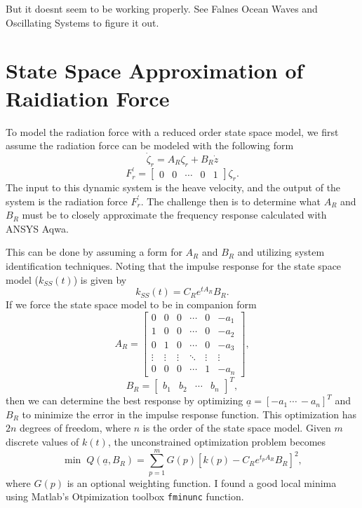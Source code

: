 \documentclass[12pt]{article}
\begin{document}
But it doesnt seem to be working properly. See Falnes Ocean Waves and Oscillating Systems to figure it out.


\section*{State Space Approximation of Raidiation Force}

To model the radiation force with a reduced order state space model, we first assume the radiation force can be modeled with the following form
\[
	\dot{\zeta}_r = A_R \zeta_r + B_R \dot{z}
\]
\[
	F_r^\prime = 
	\begin{bmatrix}
		0 & 0 & \cdots & 0 & 1
	\end{bmatrix} 
	\zeta_r.
\]
The input to this dynamic system is the heave velocity, and the output of the system is the radiation force $F_r^\prime$. The challenge then is to determine what $A_R$ and $B_R$ must be to closely approximate the frequency response calculated with ANSYS Aqwa.

This can be done by assuming a form for $A_R$ and $B_R$ and utilizing system identification techniques. Noting that the impulse response for the state space model ($k_{SS}(t)$) is given by
\[
	k_{SS}(t) = C_R e^{t A_R} B_R.
\]
If we force the state space model to be in companion form
\[
	A_R = 
	\begin{bmatrix}
		0 & 0 & 0 & \cdots & 0 & -a_1 \\
		1 & 0 & 0 & \cdots & 0 & -a_2 \\
		0 & 1 & 0 & \cdots & 0 & -a_3 \\
		\vdots & \vdots & \vdots & \ddots & \vdots & \vdots \\
		0 & 0 & 0 & \cdots & 1 & -a_n
	\end{bmatrix},
\]
\[
	B_R = 
	\begin{bmatrix}
		b_1 & b_2 & \cdots & b_n
	\end{bmatrix}^T,
\]
then we can determine the best response by optimizing $\underline{a} = [-a_1 \, \cdots  \, -a_n]^T$ and $B_R$ to minimize the error in the impulse response function. This optimization has $2n$ degrees of freedom, where $n$ is the order of the state space model. Given $m$ discrete values of $k(t)$, the unconstrained optimization problem becomes
\[
	\min \; Q(\underline{a}, B_R) = \sum_{p = 1}^{m} G(p) [k(p) - C_R e^{t_p A_R} B_R ]^2,
\]
where $G(p)$ is an optional weighting function. I found a good local minima using Matlab's Otpimization toolbox \texttt{fminunc} function.
\end{document}
